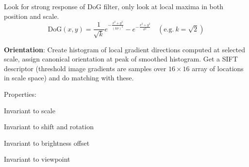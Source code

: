 \begin{algorithm}
  Look for strong response of DoG filter, only look at local maxima in both position and scale.
  \[\text{DoG}(x, y) = \frac{1}{\sqrt{k}} e^{- \frac{x^2 + y^2}{(k\sigma)^2}} - e^{- \frac{x^2 + y^2}{\sigma^2}} \quad (\text{e.g.} \ k = \sqrt{2})\]

  \textbf{Orientation}: Create histogram of local gradient directions computed at selected scale, assign canonical orientation at peak of smoothed histogram. Get a SIFT descriptor (threshold image gradients are samples over \(16 \times 16\) array of locations in scale space) and do matching with these.

  Properties:
  \begin{itemize*}
    \item Invariant to scale
    \item Invariant to shift and rotation
    \item Invariant to brightness offset
    \item Invariant to viewpoint
  \end{itemize*}
\end{algorithm}
